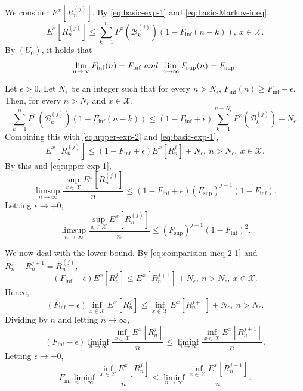 \documentclass[10pt,a4paper]{amsart}
\begin{document}
We consider $E^x \left[ R^{(j)}_{n} \right]$. 
By \eqref{eq:basic-exp-1} and \eqref{eq:basic-Markov-ineq}, 
\begin{equation}\label{eq:upper-exp-2}  
E^x \left[ R^{(j)}_{n} \right] \le  \sum_{k=1}^{n} P^x \left(\mathcal{B}_{k}^{(j)} \right) (1- F_{\inf}(n-k)),  \ x \in \mathcal{X}.  
\end{equation}
By $(U_0)$, it holds that 
\[ \lim_{n \to \infty} F_{\inf} (n) = F_{\inf} \ \textup{ and } \  \lim_{n \to \infty} F_{\sup} (n) = F_{\sup}. \]

Let $\epsilon > 0$. 
Let $N_{\epsilon}$ be an integer such that for every $n > N_{\epsilon}$, $F_{\inf}(n) \ge F_{\inf} - \epsilon$. 
Then, for every $n > N_{\epsilon}$ and $x \in \mathcal{X}$, 
\begin{equation*}
\sum_{k=1}^{n} P^x \left(\mathcal{B}_{k}^{(j)} \right) (1- F_{\inf}(n-k)) \le (1 - F_{\inf} + \epsilon) \sum_{k=1}^{n - N_{\epsilon}}  P^x \left(\mathcal{B}_{k}^{(j)} \right) + N_{\epsilon}. 
\end{equation*}
Combining this with \eqref{eq:upper-exp-2} and \eqref{eq:basic-exp-1}, 
\begin{equation}\label{eq:comparision-ineq-2-1} 
E^x \left[ R^{(j)}_{n} \right]  \le  (1 - F_{\inf} + \epsilon) E^x \left[ R^{j}_{n} \right]  + N_{\epsilon}, \ n > N_{\epsilon}, \ x \in \mathcal{X}.  
\end{equation}
By this and \eqref{eq:upper-exp-1},
\[ \limsup_{n \to \infty} \frac{\sup_{x \in \mathcal{X}} E^{x} \left[R_n^{(j)} \right]}{n}  \le (1 - F_{\inf} + \epsilon)  (F_{\sup})^{j-1} (1 - F_{\inf}).   \]
Letting $\epsilon \to +0$, 
\[ \limsup_{n \to \infty} \frac{\sup_{x \in \mathcal{X}} E^{x} \left[R_n^{(j)} \right]}{n}  \le (F_{\sup})^{j-1} (1 - F_{\inf})^2.   \]

We now deal with the lower bound. 
By \eqref{eq:comparision-ineq-2-1} and $R_n^j - R_n^{j+1} = R_n^{(j)}$, 
\[ (F_{\inf} - \epsilon) E^x \left[ R^{j}_{n} \right] \le E^x \left[ R^{j+1}_{n} \right] + N_{\epsilon}, \ n > N_{\epsilon}, \ x \in \mathcal{X}. \]
Hence, 
\[ (F_{\inf} - \epsilon) \inf_{x \in \mathcal{X}} E^x \left[ R^{j}_{n} \right] \le \inf_{x \in \mathcal{X}} E^x \left[ R^{j+1}_{n} \right] + N_{\epsilon}, \ n > N_{\epsilon}. \]
Dividing by $n$ and letting $n \to \infty$, 
\[ (F_{\inf} - \epsilon) \liminf_{n \to \infty} \frac{\inf_{x \in \mathcal{X}} E^{x} \left[R_n^j \right]}{n} \le \liminf_{n \to \infty} \frac{\inf_{x \in \mathcal{X}} E^{x} \left[R_n^{j+1} \right]}{n}. \]
Letting $\epsilon \to +0$, 
\[ F_{\inf} \liminf_{n \to \infty} \frac{\inf_{x \in \mathcal{X}} E^{x} \left[R_n^j \right]}{n} \le \liminf_{n \to \infty} \frac{\inf_{x \in \mathcal{X}} E^{x} \left[R_n^{j+1} \right]}{n}. \]
\end{document}
